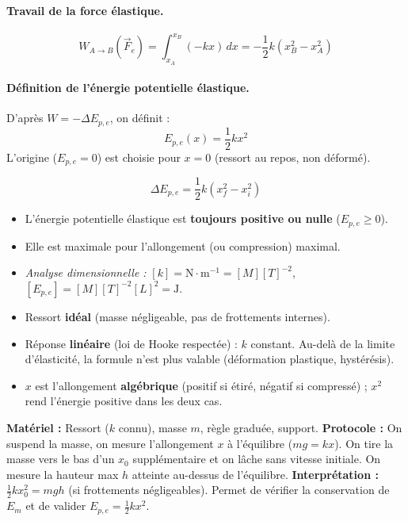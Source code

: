 \documentclass[11pt]{article}
\begin{document}
\paragraph{Travail de la force élastique.}
\[
W_{A \to B}(\vec{F}_e) = \int_{x_A}^{x_B} (-kx)\, dx = -\frac{1}{2}k(x_B^2 - x_A^2)
\]

\paragraph{Définition de l'énergie potentielle élastique.}
D'après $W = -\Delta E_{p,e}$, on définit :
\[
\boxed{E_{p,e}(x) = \frac{1}{2}k x^2}
\]
L'origine ($E_{p,e}=0$) est choisie pour $x=0$ (ressort au repos, non déformé).

\begin{propriete}
\[
\boxed{\Delta E_{p,e} = \frac{1}{2}k(x_f^2 - x_i^2)}
\]
\begin{itemize}
    \item L'énergie potentielle élastique est \textbf{toujours positive ou nulle} ($E_{p,e} \ge 0$).
    \item Elle est maximale pour l'allongement (ou compression) maximal.
    \item \emph{Analyse dimensionnelle :} $[k] = \text{N}\!\cdot\!\text{m}^{-1} = [M][T]^{-2}$, $[E_{p,e}] = [M][T]^{-2}[L]^2 = \text{J}$.
\end{itemize}
\end{propriete}

\begin{attention}[Conditions d'application de $E_{p,e} = \frac{1}{2}kx^2$]
\begin{itemize}
    \item Ressort \textbf{idéal} (masse négligeable, pas de frottements internes).
    \item Réponse \textbf{linéaire} (loi de Hooke respectée) : $k$ constant. Au-delà de la limite d'élasticité, la formule n'est plus valable (déformation plastique, hystérésis).
    \item $x$ est l'allongement \textbf{algébrique} (positif si étiré, négatif si compressé) ; $x^2$ rend l'énergie positive dans les deux cas.
\end{itemize}
\end{attention}

\begin{experience}
\textbf{Matériel :} Ressort ($k$ connu), masse $m$, règle graduée, support.
\textbf{Protocole :} On suspend la masse, on mesure l'allongement $x$ à l'équilibre ($mg = kx$). On tire la masse vers le bas d'un $x_0$ supplémentaire et on lâche sans vitesse initiale. On mesure la hauteur max $h$ atteinte au-dessus de l'équilibre.
\textbf{Interprétation :} $\frac{1}{2}k x_0^2 = mgh$ (si frottements négligeables). Permet de vérifier la conservation de $E_m$ et de valider $E_{p,e} = \frac{1}{2}kx^2$.
\end{experience}
\end{document}

